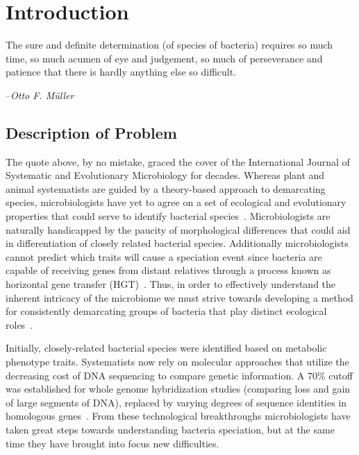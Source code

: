 \gobbletocpage
\chapter{Introduction}
\restoretocpage

\begin{shadequote}
The sure and definite determination (of species of bacteria) requires so much time, so much acumen of eye and judgement, so much of perseverance and patience that there is hardly anything else so \mbox{difficult}. \par--\emph{Otto F. M\"uller}
\end{shadequote}


\section{Description of Problem}
The quote above, by no mistake, graced the cover of the International Journal of Systematic and Evolutionary Microbiology for decades.
Whereas plant and animal systematists are guided by a theory-based approach to demarcating species, microbiologists have yet to agree on a set of ecological and evolutionary properties that could serve to identify bacterial species~\cite{cohan2007systematics}.
Microbiologists are naturally handicapped by the paucity of morphological differences that could aid in differentiation of closely related bacterial species.
Additionally microbiologists cannot predict which traits will cause a speciation event since bacteria are capable of receiving genes from distant relatives through a process known as horizontal gene transfer (HGT)~\cite{cohan2007systematics}.
Thus, in order to effectively understand the inherent intricacy of the microbiome we must strive towards developing a method for consistently demarcating groups of bacteria that play distinct ecological roles~\cite{koeppel2008identifying}.

Initially, closely-related bacterial species were identified based on metabolic phenotype traits.
Systematists now rely on molecular approaches that utilize the decreasing cost of DNA sequencing to compare genetic information.
A 70\% cutoff was established for whole genome hybridization studies (comparing loss and gain of large segments of DNA), replaced by varying degrees of sequence identities in homologous genes~\cite{cohan2007systematics,carlo,staley1997biodiversity}.
From these technological breakthroughs microbiologists have taken great steps towards understanding bacteria speciation, but at the same time they have brought into focus new difficulties.


